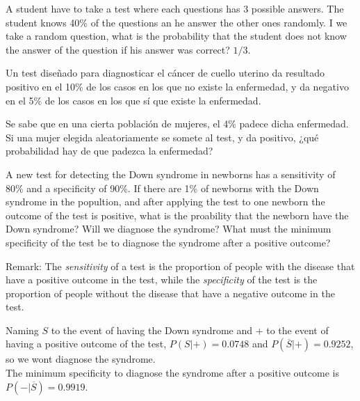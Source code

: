 {A student have to take a test where each questions has 3 possible answers. 
The student knows 40\% of the questions an he answer the other ones randomly. 
I we take a random question, what is the probability that the student does not know the answer of the question  if his answer was correct?
}
{$1/3$.}
{}


{Un test diseñado para diagnosticar el cáncer de cuello uterino da resultado positivo en el 10\% de los casos en los
que no existe la enfermedad, y da negativo en el 5\% de los casos en los que sí que existe la enfermedad.

Se sabe que en una cierta población de mujeres, el 4\% padece dicha enfermedad.
Si una mujer elegida aleatoriamente se somete al test, y da positivo, ¿qué probabilidad hay de que padezca la
enfermedad?}
{}
{}


{A new test for detecting the Down syndrome in newborns has a sensitivity of 80\% and a specificity of 90\%.
If there are 1\% of newborns with the Down syndrome in the popultion, and after applying the test to one newborn the outcome of the test is positive, what is the proability that the newborn have the Down syndrome? 
Will we diagnose the syndrome?
What must the minimum specificity of the test be to diagnose the syndrome after a positive outcome?

Remark: The \emph{sensitivity} of a test is the proportion of people with the disease that have a positive outcome in the test, while the \emph{specificity} of the test is the proportion of people without the disease that have a negative outcome in the test.}
{Naming $S$ to the event of having the Down syndrome and $+$ to the event of having a positive outcome of the test, $P(S|+)=0.0748$ and $P(\overline{S}|+)=0.9252$, so we wont diagnose the syndrome.\\
The minimum specificity to diagnose the syndrome after a positive outcome is $P(-|\overline{S})=0.9919$.}
{}


